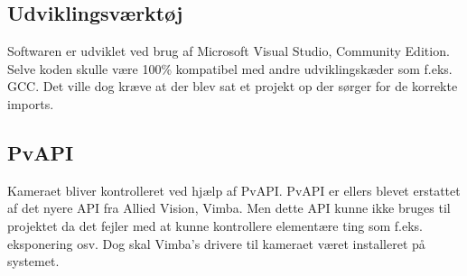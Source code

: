 \subsection{Udviklingsværktøj}
Softwaren er udviklet ved brug af Microsoft Visual Studio, Community Edition. Selve koden skulle være 100\% kompatibel med andre udviklingskæder som f.eks. GCC. Det ville dog kræve at der blev sat et projekt op der sørger for de korrekte imports.

\subsection{PvAPI}
Kameraet bliver kontrolleret ved hjælp af PvAPI. PvAPI er ellers blevet erstattet af det nyere API fra Allied Vision, Vimba. Men dette API kunne ikke bruges til projektet da det fejler med at kunne kontrollere elementære ting som f.eks. eksponering osv.
Dog skal Vimba's drivere til kameraet været installeret på systemet.
